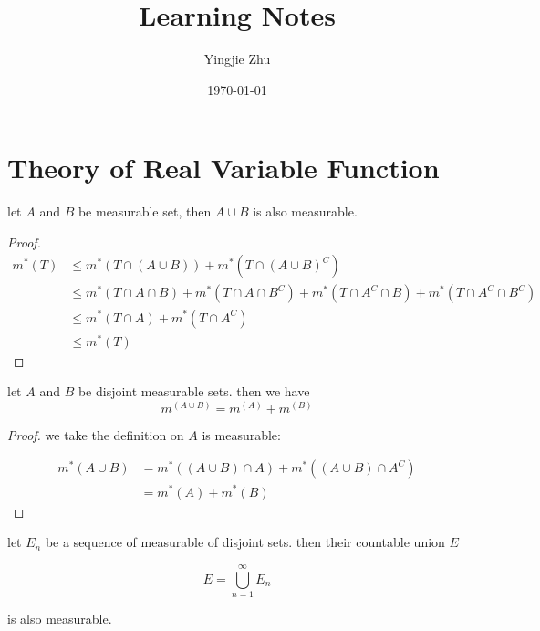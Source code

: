 \documentclass[11pt,a4paper]{article}
\title{Learning Notes}
\author{Yingjie Zhu}
\date{\today}
\begin{document}
\maketitle

\section{Theory of Real Variable Function}

\begin{exercise}
    let $A$ and $B$ be measurable set, then $A \cup B$ is also measurable.
\end{exercise}

\begin{proof}
    \begin{align*}
        m^*(T) & \le m^*(T \cap (A \cup B)) + m^*(T \cap (A \cup B)^C) \\
            & \le m^*(T \cap A \cap B) + m^*(T \cap A \cap B^C) + m^*(T \cap A^C \cap B) + m^*(T \cap A^C \cap B^C) \\
            & \le m^*(T \cap A) + m^*(T \cap A^C) \\
            & \le m^*(T)
    \end{align*}
\end{proof}

\begin{exercise}
    let $A$ and $B$ be disjoint measurable sets. then we have
    \[
        m^(A \cup B) = m^(A) + m^(B)
    \]
\end{exercise}

\begin{proof}
    we take the definition on $A$ is measurable:

    \begin{align*}
        m^*(A \cup B) &= m^*((A \cup B) \cap A) + m^*((A \cup B) \cap A^C) \\
        &= m^*(A) + m^*(B)
    \end{align*}
\end{proof}

\begin{exercise}
    let $E_n$ be a sequence of measurable of disjoint sets. then their countable union $E$

    \[
        E = \bigcup_{n=1}^{\infty}E_n
    \]

    is also measurable.
\end{exercise}
\end{document}
